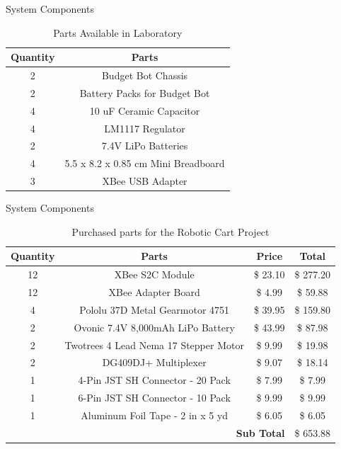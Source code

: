 \documentclass{beamer}
\begin{document}
\begin{frame}{System Components}
  \begin{table}[h!]
      \centering
      \begin{tabular}{c|c}
          \toprule
          \textbf{Quantity} & \textbf{Parts}\\
          \toprule
          2 & Budget Bot Chassis\\
          2 & Battery Packs for Budget Bot\\
          4 & 10 uF Ceramic Capacitor\\
          4 & LM1117 Regulator\\
          2 & 7.4V LiPo Batteries\\
          4 & 5.5 x 8.2 x 0.85 cm Mini Breadboard\\
          3 & XBee USB Adapter\\
          \bottomrule
      \end{tabular}
      \caption{Parts Available in Laboratory}
      \label{tab:Partslablist}
  \end{table}
\end{frame}


\begin{frame}{System Components}
  \begin{table}[h!]
    \centering
    \small
    \begin{tabular}{c|c|c|c}
      \toprule
      \textbf{Quantity} & \textbf{Parts} & \textbf{Price} & \textbf{Total}\\
      \toprule
      12 & XBee S2C Module & \$ 23.10 & \$ 277.20\\
      12 & XBee Adapter Board & \$ 4.99 & \$ 59.88\\
      4 & Pololu 37D Metal Gearmotor 4751 & \$ 39.95 & \$ 159.80\\
      2 & Ovonic 7.4V 8,000mAh LiPo Battery & \$ 43.99 & \$ 87.98\\
      2 & Twotrees 4 Lead Nema 17 Stepper Motor & \$ 9.99 & \$ 19.98\\
      2 & DG409DJ+ Multiplexer & \$ 9.07 & \$ 18.14\\
      1 & 4-Pin JST SH Connector - 20 Pack & \$ 7.99 & \$ 7.99\\
      1 & 6-Pin JST SH Connector - 10 Pack & \$ 9.99 & \$ 9.99\\
      1 & Aluminum Foil Tape - 2 in x 5 yd & \$ 6.05 & \$ 6.05\\
      \bottomrule
      \multicolumn{3}{r|}{\textbf{Sub Total}} & \$ 653.88\\
      \bottomrule
    \end{tabular}
    \caption{Purchased parts for the Robotic Cart Project}
    \label{tab:Partslist}
  \end{table}
\end{frame}
 
\end{document}
